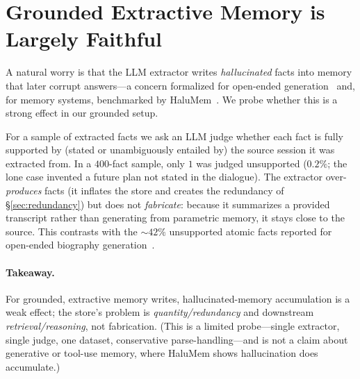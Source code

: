 \section{Grounded Extractive Memory is Largely Faithful}
\label{sec:faithfulness}

A natural worry is that the LLM extractor writes \emph{hallucinated} facts into
memory that later corrupt answers---a concern formalized for open-ended
generation~\cite{min2023factscore,zhang2023snowball} and, for memory systems,
benchmarked by HaluMem~\cite{chen2025halumem}. We probe whether this is a strong
effect in our grounded setup.

For a sample of extracted facts we ask an LLM judge whether each fact is fully
supported by (stated or unambiguously entailed by) the source session it was
extracted from. In a $400$-fact sample, only $1$ was judged unsupported
($0.2\%$; the lone case invented a future plan not stated in the dialogue). The
extractor over-\emph{produces} facts (it inflates the store
and creates the redundancy of \S\ref{sec:redundancy}) but does not
\emph{fabricate}: because it summarizes a provided transcript rather than
generating from parametric memory, it stays close to the source. This contrasts
with the $\sim\!42\%$ unsupported atomic facts reported for open-ended
biography generation~\cite{min2023factscore}.

\paragraph{Takeaway.} For grounded, extractive memory writes, hallucinated-memory
accumulation is a weak effect; the store's problem is \emph{quantity/redundancy}
and downstream \emph{retrieval/reasoning}, not fabrication. (This is a limited
probe---single extractor, single judge, one dataset, conservative
parse-handling---and is not a claim about generative or tool-use memory, where
HaluMem shows hallucination does accumulate.)
